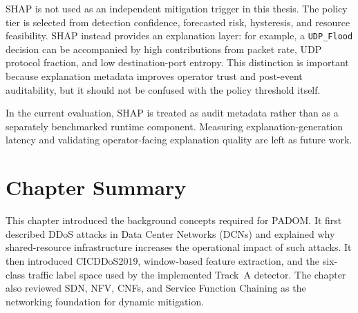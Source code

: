 \documentclass[12pt, a4paper, reqno, oneside]{book}
\newcommand{\padonap}{\textsc{PADOM}}
\begin{document}
SHAP is not used as an independent mitigation trigger in this thesis. The
policy tier is selected from detection confidence, forecasted risk, hysteresis,
and resource feasibility. SHAP instead provides an explanation layer: for
example, a \texttt{UDP\_Flood} decision can be accompanied by high
contributions from packet rate, UDP protocol fraction, and low destination-port
entropy. This distinction is important because explanation metadata improves
operator trust and post-event auditability, but it should not be confused with
the policy threshold itself.


In the current evaluation, SHAP is treated as audit metadata rather than as a
separately benchmarked runtime component. Measuring explanation-generation
latency and validating operator-facing explanation quality are left as future
work.


\section{Chapter Summary}
\label{sec:bg-summary}

This chapter introduced the background concepts required for \padonap{}. It
first described DDoS attacks in Data Center Networks (DCNs) and explained why
shared-resource infrastructure increases the operational impact of such
attacks. It then introduced CICDDoS2019, window-based feature extraction, and
the six-class traffic label space used by the implemented Track~A detector. The chapter also
reviewed SDN, NFV, CNFs, and Service Function Chaining as the networking
foundation for dynamic mitigation.
\end{document}

